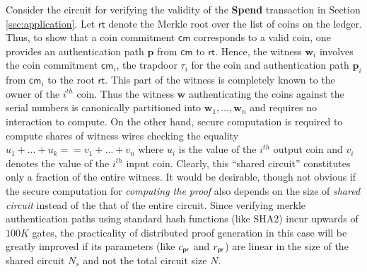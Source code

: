 Consider the circuit for verifying the validity of the {\bf Spend} transaction in Section \ref{sec:application}. 
Let $\mathsf{rt}$ denote the Merkle root over the list of coins on the ledger. Thus, to show that a coin 
commitment $\mathsf{cm}$ corresponds to a valid coin, one provides an authentication path $\bm{p}$ from 
$\mathsf{cm}$ to $\mathsf{rt}$. Hence, the witness $\bm{w}_i$ involves the coin commitment $\mathsf{cm}_i$, the trapdoor $\tau_i$ for the coin and authentication path $\bm{p}_i$ from $\mathsf{cm}_i$ to the root $\mathsf{rt}$. This part of the witness is completely known to the owner of the $i^{th}$ coin. Thus the witness $\bm{w}$ authenticating the coins against the serial numbers is canonically partitioned into $\bm{w}_1,\ldots,\bm{w}_n$
and requires no interaction to compute. On the other hand, secure computation is required to compute shares of witness wires 
checking the equality $u_1+\ldots+u_k == v_1+\ldots+v_n$ where $u_i$ is the value of the $i^{th}$ output coin and $v_i$ 
denotes the value of the $i^{th}$ input coin. Clearly, this ``shared circuit'' 
constitutes only a fraction of the entire witness. It would be desirable, though not obvious if the secure computation for {\em computing the proof} 
also depends on the size of {\em shared circuit} instead of the that of the entire circuit. 
Since verifying merkle authentication paths using 
standard hash functions (like SHA2) incur upwards of $100K$ gates, the practicality of distributed proof generation in this case will be
greatly improved if its parameters (like $c_\mathsf{pr}$ and $r_\mathsf{pr}$) are 
linear in the size of the shared circuit $N_s$ and not the total circuit size $N$.
